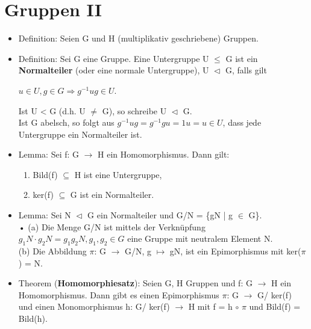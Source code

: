 \section{Gruppen II}
\begin{itemize}
\item Definition: Seien G und H (multiplikativ geschriebene) Gruppen.
\item Definition: Sei G eine Gruppe. Eine Untergruppe U $\le$ G ist ein \textbf{Normalteiler} (oder eine normale Untergruppe), U $\vartriangleleft$ G, falls gilt
\begin{center}
$u \in U, g \in G \Rightarrow g^{-1}ug \in U$.
\end{center}
Ist U < G (d.h. U $\neq$ G), so schreibe U $\vartriangleleft$ G.\\
Ist G abelsch, so folgt aus $g^{-1}ug = g^{-1}gu = 1u = u \in U$, dass jede Untergruppe ein Normalteiler ist.
\item Lemma: Sei f: G $\to$ H ein Homomorphismus. Dann gilt:
\begin{enumerate}
\item Bild(f) $\subseteq$ H ist eine Untergruppe,
\item ker(f) $\subseteq$ G ist ein Normalteiler.
\end{enumerate}
\item Lemma: Sei N $\vartriangleleft$ G ein Normalteiler und G/N = \{gN | g $\in$ G\}.\\•
(a) Die Menge G/N ist mittels der Verknüpfung $g_1N \cdot g_2N = g_1g_2N, g_1,g_2 \in G$ eine Gruppe mit neutralem \hspace*{5mm} Element N.\\
(b) Die Abbildung $\pi$: G $\to$ G/N, g $\mapsto$ gN, ist ein Epimorphismus mit ker($\pi$) = N.
\item Theorem (\textbf{Homomorphiesatz}): Seien G, H Gruppen und f: G $\to$ H ein Homomorphismus. Dann gibt es einen Epimorphismus $\pi$: G $\to$ G/ ker(f) und einen Monomorphismus h: G/ ker(f) $\to$ H mit f = h $\circ$ $\pi$ und Bild(f) = Bild(h).

\end{itemize}
